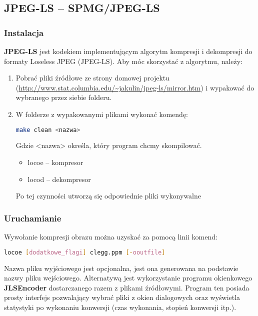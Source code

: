 \subsection{JPEG-LS -- SPMG/JPEG-LS}

\subsubsection{Instalacja}

\textbf{JPEG-LS} jest kodekiem implementującym algorytm kompresji i dekompresji do formaty Loseless JPEG (JPEG-LS). Aby móc skorzystać z algorytmu, należy:

\begin{enumerate}
	\item Pobrać pliki źródłowe ze strony domowej projektu (\url{http://www.stat.columbia.edu/~jakulin/jpeg-ls/mirror.htm}) i wypakować do wybranego przez siebie folderu.
	\item W folderze z wypakowanymi plikami wykonać komendę:
	
	\begin{lstlisting}[language=bash]
	make clean <nazwa>
	\end{lstlisting}
	
	Gdzie <nazwa> określa, który program chcmy skompilować.
	
	\begin{itemize}
		\item locoe -- kompresor
		\item locod -- dekompresor
	\end{itemize}
	
	Po tej czynności utworzą się odpowiednie pliki wykonywalne
	
\end{enumerate}

\subsubsection{Uruchamianie}

Wywołanie kompresji obrazu można uzyskać za pomocą linii komend:

\begin{lstlisting}[language=bash]
	locoe [dodatkowe_flagi] clegg.ppm [-ooutfile]
\end{lstlisting}

Nazwa pliku wyjściowego jest opcjonalna, jest ona generowana na podstawie nazwy pliku wejściowego. Alternatywą jest wykorzystanie programu okienkowego \textbf{JLSEncoder} dostarczanego razem z plikami źródłowymi. Program ten posiada prosty interfejs pozwalający wybrać pliki z okien dialogowych oraz wyświetla statystyki po wykonaniu konwersji (czas wykonania, stopień konwersji itp.).

